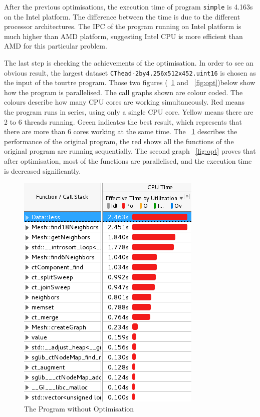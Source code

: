\documentclass[conference]{IEEEtran}
\newcommand{\fref}[1]{\figurename~\ref{#1}}
\begin{document}
After the previous optimisations, the execution time of program \texttt{simple} is 4.163s on the Intel platform. The difference between the time is due to the different processor architectures. The IPC of the program running on Intel platform is much higher than AMD platform, suggesting Intel CPU is more efficient than AMD for this particular problem.

The last step is checking the achievements of the optimisation.
In order to see an obvious result, the largest dataset \texttt{CThead-2by4.256x512x452.uint16} is chosen as the input of the tourtre program.
Those two figures (\fref{fig:noopt} and \fref{fig:opt})below show how the program is parallelised.
The call graphs shown are colour coded. The colours describe how many CPU cores are working simultaneously.
Red means the program runs in series, using only a single CPU core. Yellow means there are 2 to 6 threads running. Green indicates the best result, which represents that there are more than 6 cores working at the same time.
The \fref{fig:noopt} describes the performance of the original program, the red shows all the functions of the original program are running sequentially. The second graph \fref{fig:opt} proves that after optimisation, most of the functions are parallelised, and the execution time is decreased significantly. 

\begin{figure}[!h]
    \centering
    \includegraphics[width=0.75\columnwidth]{noopt_vtune}
    \caption{The Program without Optimisation}
    \label{fig:noopt}
\end{figure}
\end{document}
